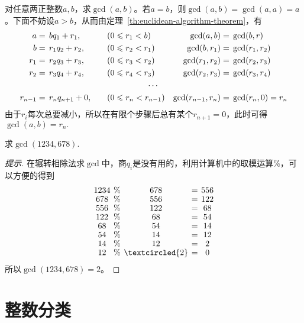 \begin{definition}[辗转相除法]
  对任意两正整数$a,b$，求$\gcd(a,b)$。若$a=b$，则$\gcd(a,b)=\gcd(a,a)=a$。下面不妨设$a>b$，从而由定理~\ref{th:euclidean-algorithm-theorem}，有
  \begin{align*}
    a&=  \,bq_1 + r_1,   &&\quad(0\le r_1 < b)   & \gcd(a,b)    &=\,\gcd(b,r)\\
    b&=  \,r_1q_2 + r_2, &&\quad(0\le r_2 < r_1) & \gcd(b,r_1)  &=\,\gcd(r_1, r_2)\\ 
    r_1&=\,r_2q_3 + r_3, &&\quad(0\le r_3 < r_2) & \gcd(r_1,r_2)&=\,\gcd(r_2, r_3)\\
    r_2&=\,r_3q_4 + r_4, &&\quad(0\le r_4 < r_3) & \gcd(r_2,r_3)&=\,\gcd(r_3, r_4)\\
    \multicolumn{7}{c}{$\cdots$}\\
    r_{n-1}&=\,r_nq_{n+1} + 0, &&\quad(0\le r_n < r_{n-1}) & \gcd(r_{n-1},r_n)&=\,\gcd(r_{n}, 0)=r_{n}
  \end{align*}
  由于$r_i$每次总要减小，所以在有限个步骤后总有某个$r_{n+1}=0$，此时可得$\gcd(a,b)=r_n.$
\end{definition}

\begin{example}
  求$\gcd(1234,678).$
\end{example}
\begin{proof}[提示]在辗转相除法求$\gcd$中，商$q_i$是没有用的，利用计算机中的取模运算\%，可以方便的得到
  \begin{align*}\renewcommand{\arraystretch}{.9}\setlength{\arraycolsep}{2pt}
    \begin{array}{ccccc}
      1234 & \% & 678 & = & 556\\
      678  & \% & 556 & = & 122\\
      556  & \% & 122 & = & 68\\
      122  & \% & 68  & = & 54\\
      68   & \% & 54  & = & 14\\
      54   & \% & 14  & = & 12\\
      14   & \% & 12  & = & 2\\
      12   & \% & \textcircled{2}   & = & 0
    \end{array}
  \end{align*}
  所以$\gcd(1234,678)=2$。
\end{proof}

\section{整数分类}
\label{sec:category}

